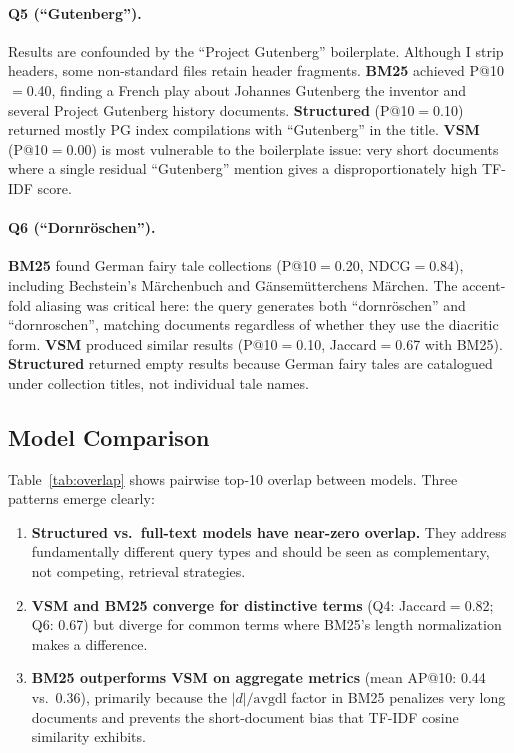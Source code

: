 \documentclass[sigconf,nonacm]{acmart}
\begin{document}
\paragraph{Q5 (``Gutenberg'').}
Results are confounded by the ``Project Gutenberg'' boilerplate.  Although
I strip headers, some non-standard files retain header fragments.
\textbf{BM25} achieved P@10$=$0.40, finding a French play about Johannes
Gutenberg the inventor and several Project Gutenberg history documents.
\textbf{Structured} (P@10$=$0.10) returned mostly PG index compilations with
``Gutenberg'' in the title.  \textbf{VSM} (P@10$=$0.00) is most vulnerable to
the boilerplate issue: very short documents where a single residual
``Gutenberg'' mention gives a disproportionately high TF-IDF score.

\paragraph{Q6 (``Dornr\"oschen'').}
\textbf{BM25} found German fairy tale collections (P@10$=$0.20,
NDCG$=$0.84), including Bechstein's M\"archenbuch and
G\"ansem\"utterchens M\"archen.  The accent-fold aliasing was
critical here: the query generates both ``dornr\"oschen'' and
``dornroschen'', matching documents regardless of whether they use the
diacritic form.  \textbf{VSM} produced similar results (P@10$=$0.10,
Jaccard$=$0.67 with BM25).  \textbf{Structured} returned empty results because
German fairy tales are catalogued under collection titles, not individual tale
names.

\subsection{Model Comparison}



Table~\ref{tab:overlap} shows pairwise top-10 overlap between models.  Three
patterns emerge clearly:
\begin{enumerate}[nosep]
  \item \textbf{Structured vs.\ full-text models have near-zero overlap.}
        They address fundamentally different query types and should be seen
        as complementary, not competing, retrieval strategies.
  \item \textbf{VSM and BM25 converge for distinctive terms} (Q4:
        Jaccard$=$0.82; Q6: 0.67) but diverge for common terms where BM25's
        length normalization makes a difference.
  \item \textbf{BM25 outperforms VSM on aggregate metrics}
        (mean AP@10: 0.44 vs.\ 0.36), primarily because the
        $|d|/\text{avgdl}$ factor in BM25 penalizes very long documents and
        prevents the short-document bias that TF-IDF cosine similarity exhibits.
\end{enumerate}
\end{document}
